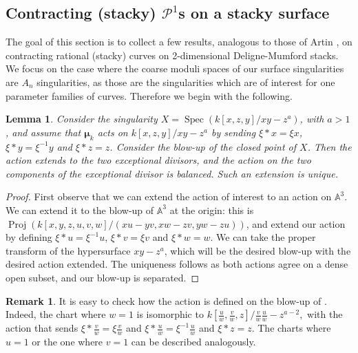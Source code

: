 \documentclass{amsart}
\newcommand{\bA}{\mathbb{A}}
\newcommand{\cP}{\mathcal{P}}
\newcommand{\spec}{\operatorname{Spec}}
\newcommand{\bmu}{\bm{\mu}}
\newtheorem{Lemma}[theorem]{Lemma}
\theoremstyle{definition}
\newtheorem{Oss}[theorem]{Remark}
\begin{document}
\subsection{Contracting (stacky) $\cP^1$s on a stacky surface}\label{subsection contracting rational curves}
The goal of this section is to collect a few results, analogous to those of Artin \cite{Artin_contracting_curves}, on contracting rational (stacky) curves on 2-dimensional Deligne-Mumford stacks. We focus on the case where the coarse moduli spaces of our surface singularities are $A_n$ singularities, as those are the singularities which are of interest for one parameter families of curves.  Therefore we begin with the following. 
\begin{Lemma}\label{Lemma extend the action around a node to a resolution}
Consider the singularity $X=\spec(k[x,z,y]/xy-z^a)$, with $a>1$,  and assume that $\bmu_k$ acts on $k[x,z,y]/xy-z^a$ by sending $\xi*x= \xi x$, $\xi*y= \xi^{-1} y$ and $\xi*z=z$. Consider the blow-up of the closed point of $X$. Then the action extends to the two exceptional divisors, and the action on the two components of the exceptional divisor is balanced. Such an extension is unique.
\end{Lemma}
\begin{proof}First observe that we can extend the action of interest to an action on $\bA^3$. We can extend it to the blow-up of $\bA^3$ at the origin: this is $\operatorname{Proj}(k[x,y,z,u,v,w]/(xu-yv, xw-zv, yw-zu))$, and extend our action by defining $\xi*u=\xi^{-1}u$, $\xi*v=\xi v$ and $\xi*w = w$.  We can take the proper transform of the hypersurface $xy-z^a$, which will be the desired blow-up with the desired action extended. The uniqueness follows as both actions agree on a dense open subset, and our blow-up is separated.
\end{proof}
\begin{Oss}\label{Oss extend the action around a node to a resolution}It is easy to check how the action is defined on the blow-up of . Indeed, the chart where $w=1$ is isomorphic to $k[\frac{u}{w}, \frac{v}{w}, z]/\frac{v}{w}\frac{u}{w}-z^{a-2},$ with the action that sends $\xi * \frac{v}{w} = \xi\frac{v}{w}$ and $\xi*\frac{u}{w} = \xi^{-1}\frac{u}{w}$ and $\xi*z = z$. The charts where $u=1$ or the one where $v=1$ can be described analogously. 
\end{Oss}
\end{document}
